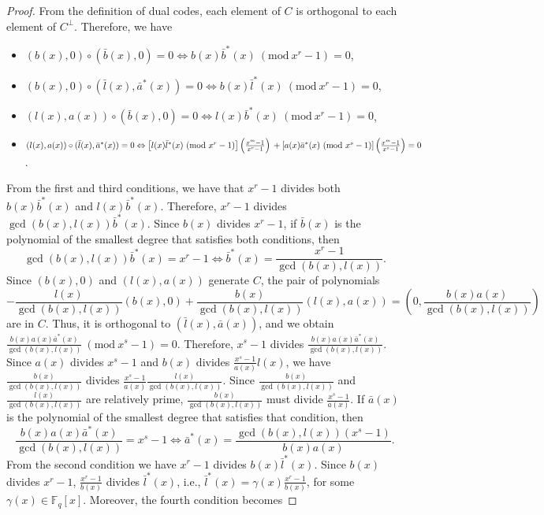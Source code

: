 \documentclass[12pt]{article}
\newcommand{\Mod}[1]{\ (\mathrm{mod}\ #1)}
\begin{document}
	\begin{proof}
		From the definition of dual codes, each element of $C$ is orthogonal to each element of $C^{\perp}$. Therefore, we have
		\begin{itemize}
			\item $(b(x),0)\circ (\bar{b}(x),0)=0 \Leftrightarrow b(x) \bar{b}^{*}(x) \Mod{x^r-1}=0$,
			\item $(b(x),0)\circ (\bar{l}(x),\bar{a}^{*}(x))=0 \Leftrightarrow b(x) \bar{l}^{*}(x) \Mod{x^r-1}=0$,
			\item $(l(x),a(x))\circ (\bar{b}(x),0)=0 \Leftrightarrow l(x) \bar{b}^{*}(x) \Mod{x^r-1}=0$,
			\item $(l(x),a(x))\circ (\bar{l}(x),\bar{a}^{*}(x))=0 \Leftrightarrow \left[l(x) \bar{l}^{*}(x) \Mod{x^r-1}\right]\left(\frac{x^m-1}{x^r-1}\right)\\
			+ \left[a(x) \bar{a}^{*}(x)\Mod{x^s -1}\right]\left(\frac{x^m-1}{x^s-1}\right)=0$.
		\end{itemize}
		From the first and third conditions, we have that $x^r-1$ divides both $b(x)\bar{b}^{*}(x)$ and $l(x)\bar{b}^{*}(x)$. Therefore, $x^r-1$ divides $\gcd(b(x),l(x))\bar{b}^{*}(x)$. Since $b(x)$ divides $x^r-1$, if $\bar{b}(x)$ is the polynomial of the smallest degree that satisfies both conditions, then $$\gcd(b(x),l(x))\bar{b}^{*}(x)=x^r-1\Leftrightarrow \bar{b}^{*}(x)=\frac{x^r-1}{\gcd(b(x),l(x))}.$$
		Since $(b(x),0)$ and $(l(x),a(x))$ generate $C$, the pair of polynomials $$-\frac{l(x)}{\gcd(b(x),l(x))}(b(x),0)+\frac{b(x)}{\gcd(b(x),l(x))}(l(x),a(x))=\left(0,\frac{b(x)a(x)}{\gcd(b(x),l(x))}\right)$$ are in $C$. Thus, it is orthogonal to $(\bar{l}(x),\bar{a}(x))$, and we obtain $\frac{b(x)a(x)\bar{a}^{*}(x)}{\gcd(b(x),l(x))}\Mod{x^s-1}=0$. Therefore, $x^s-1$ divides $\frac{b(x)a(x)\bar{a}^{*}(x)}{\gcd(b(x),l(x))}$. Since $a(x)$ divides $x^s-1$ and $b(x)$ divides $\frac{x^s-1}{a(x)}l(x)$, we have $\frac{b(x)}{\gcd(b(x),l(x))}$ divides $\frac{x^s-1}{a(x)}\frac{l(x)}{\gcd(b(x),l(x))}$. Since $\frac{b(x)}{\gcd(b(x),l(x))}$ and $\frac{l(x)}{\gcd(b(x),l(x))}$ are relatively prime, $\frac{b(x)}{\gcd(b(x),l(x))}$ must divide $\frac{x^s-1}{a(x)}$. If $\bar{a}(x)$ is the polynomial of the smallest degree that satisfies that condition, then $$\frac{b(x)a(x)\bar{a}^{*}(x)}{\gcd(b(x),l(x))}=x^s-1\Leftrightarrow \bar{a}^{*}(x)=\frac{\gcd(b(x),l(x))(x^s-1)}{b(x)a(x)}.$$
		From the second condition we have $x^r-1$ divides $b(x)\bar{l}^{*}(x)$. Since $b(x)$ divides $x^r-1$, $\frac{x^r-1}{b(x)}$ divides $\bar{l}^{*}(x)$, i.e., $\bar{l}^{*}(x)=\gamma(x)\frac{x^r-1}{b(x)}$, for some $\gamma(x)\in\mathbb{F}_q[x]$. Moreover, the fourth condition becomes

\end{proof}
\end{document}
